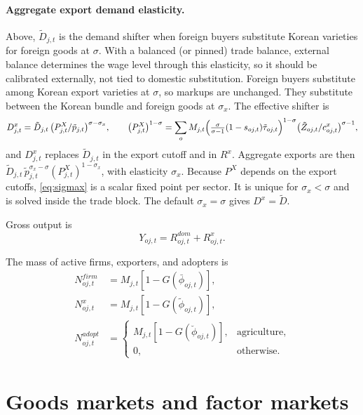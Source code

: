 \documentclass[11pt]{article}
\begin{document}
\paragraph{Aggregate export demand elasticity.} Above, $\tilde D_{j,t}$ is the demand shifter
when foreign buyers substitute Korean varieties for foreign goods at $\sigma$. With a balanced
(or pinned) trade balance, external balance determines the wage level through this elasticity,
so it should be calibrated externally, not tied to domestic substitution. Foreign buyers
substitute among Korean export varieties at $\sigma$, so markups are unchanged. They substitute
between the Korean bundle and foreign goods at $\sigma_x$. The effective shifter is
\begin{equation}
  D^{x}_{j,t} = \tilde D_{j,t}\,\bigl(P^{X}_{j,t}/\tilde p_{j,t}\bigr)^{\sigma-\sigma_x},
  \qquad
  \bigl(P^{X}_{j,t}\bigr)^{1-\sigma}=\sum_o M_{j,t}\Bigl(\tfrac{\sigma}{\sigma-1}(1-s_{oj,t})\tilde\tau_{oj,t}\Bigr)^{1-\sigma}\bigl(\tilde Z_{oj,t}/c^x_{oj,t}\bigr)^{\sigma-1},
  \label{eq:sigmax}
\end{equation}
and $D^{x}_{j,t}$ replaces $\tilde D_{j,t}$ in the export cutoff and in $R^{x}$. Aggregate
exports are then $\tilde D_{j,t}\,\tilde p_{j,t}^{\sigma_x-\sigma}(P^{X}_{j,t})^{1-\sigma_x}$,
with elasticity $\sigma_x$. Because $P^X$ depends on the export cutoffs,
\eqref{eq:sigmax} is a scalar fixed point per sector. It is unique for $\sigma_x<\sigma$ and
is solved inside the trade block. The default $\sigma_x=\sigma$ gives $D^x=\tilde D$.

Gross output is
\begin{equation}
  Y_{oj,t} = R^{dom}_{oj,t} + R^{x}_{oj,t}.
\end{equation}

The mass of active firms, exporters, and adopters is
\begin{align}
  N^{firm}_{oj,t} &= M_{j,t} [1 - G(\bar\phi_{oj,t})], \\
  N^{x}_{oj,t} &= M_{j,t} [1 - G(\tilde\phi_{oj,t})], \\
  N^{adopt}_{oj,t} &=
  \begin{cases}
    M_{j,t} [1 - G(\breve\phi_{oj,t})], & \text{agriculture}, \\
    0, & \text{otherwise}.
  \end{cases}
\end{align}

\section{Goods markets and factor markets}\label{sec:factor}
\end{document}
